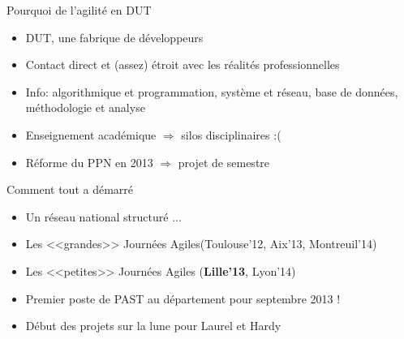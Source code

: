 \documentclass{beamer}
\begin{document}
\begin{frame}{Pourquoi de l'agilité en DUT}
   \begin{itemize}
    \item DUT, une fabrique de développeurs
    \item Contact direct et (assez) étroit avec les réalités professionnelles
    \item Info: algorithmique et programmation, système et réseau, base de données, méthodologie et analyse
    \item Enseignement académique $\Rightarrow$ silos disciplinaires :(
    \item Réforme du PPN en 2013 $\Rightarrow$ projet de semestre
   \end{itemize}
\end{frame}

\begin{frame}{Comment tout a démarré}
   \begin{itemize}
     \item Un réseau national structuré ...
     \item Les <<grandes>> Journées Agiles(Toulouse'12, Aix'13, Montreuil'14)
     \item Les <<petites>> Journées Agiles (\textbf{Lille'13}, Lyon'14)
     \item Premier poste de PAST au département pour septembre 2013 !
     \item Début des projets sur la lune pour Laurel et Hardy
   \end{itemize}
\end{frame}

{
\begin{frame}[plain]
\end{frame}
}
\end{document}
